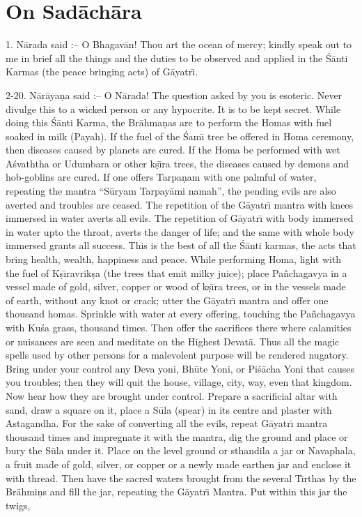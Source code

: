 \chapter{On Sad\=ach\=ara}

1. N\=arada said :-- O Bhagav\=an! Thou art the ocean of mercy; kindly speak out to me in brief all the things and the duties to be observed and applied in the \'S\=anti Karmas (the peace bringing acts) of G\=ayatr\={\i}.

2-20. N\=ar\=aya\d{n}a said :-- O N\=arada! The question asked by you is esoteric. Never divulge this to a wicked person or any hypocrite. It is to be kept secret. While doing this \'S\=anti Karma, the Br\=ahma\d{n}as are to perform the Homas with fuel soaked in milk (Payah). If the fuel of the \'Sam\={\i} tree be offered in Homa ceremony, then diseases caused by planets are cured. If the Homa be performed with wet A\'svaththa or Udumbara or other k\d{s}\={\i}ra trees, the diseases caused by demons and hob-goblins are cured. If one offers Tarpa\d{n}am with one palmful of water, repeating the mantra ``S\=uryam Tarpay\=ami namah'', the pending evils are also averted and troubles are ceased. The repetition of the G\=ayatr\={\i} mantra with knees immersed in water averts all evils. The repetition of G\=ayatr\={\i} with body immersed in water upto the throat, averts the danger of life; and the same with whole body immersed grants all success. This is the best of all the \'S\=anti karmas, the acts that bring health, wealth, happiness and peace. While performing Homa, light with the fuel of K\d{s}\={\i}ravrik\d{s}a (the trees that emit milky juice); place Pa\~nchagavya in a vessel made of gold, silver, copper or wood of k\d{s}\={\i}ra trees, or in the vessels made of earth, without any knot or crack; utter the G\=ayatr\={\i} mantra and offer one thousand homas. Sprinkle with water at every offering, touching the Pa\~nchagavya with Ku\'sa grass, thousand times. Then offer the sacrifices there where calamities or nuisances are seen and meditate on the Highest Devat\=a. Thus all the magic spells used by other persons for a malevolent purpose will be rendered nugatory. Bring under your control any Deva yoni, Bh\=ute Yoni, or Pi\'s\=acha Yoni that causes you troubles; then they will quit the house, village, city, way, even that kingdom. Now hear how they are brought under control. Prepare a sacrificial altar with sand, draw a square on it, place a S\=ula (spear) in its centre and plaster with Astagandha. For the sake of converting all the evils, repeat G\=ayatr\={\i} mantra thousand times and impregnate it with the mantra, dig the ground and place or bury the S\=ula under it. Place on the level ground or sthandila a jar or Navaphala, a fruit made of gold, silver, or copper or a newly made earthen jar and enclose it with thread. Then have the sacred waters brought from the several T\={\i}rthas by the Br\=ahmi\d{n}s and fill the jar, repeating the G\=ayatr\={\i} Mantra. Put within this jar the twigs,

